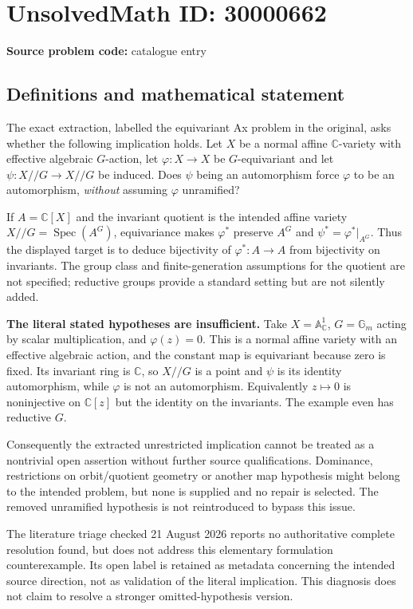 \documentclass[11pt]{article}
\newcommand{\C}{\mathbb{C}}
\begin{document}
\section*{UnsolvedMath ID: 30000662}
\textbf{Source problem code:} catalogue entry
\subsection{Definitions and mathematical statement}
The exact extraction, labelled the equivariant Ax problem in the original, asks whether the following implication holds. Let $X$ be a normal affine $\C$-variety with effective algebraic $G$-action, let $\varphi:X\to X$ be $G$-equivariant and let $\psi:X//G\to X//G$ be induced. Does $\psi$ being an automorphism force $\varphi$ to be an automorphism, \emph{without} assuming $\varphi$ unramified?

If $A=\C[X]$ and the invariant quotient is the intended affine variety $X//G=\operatorname{Spec}(A^G)$, equivariance makes $\varphi^*$ preserve $A^G$ and $\psi^*=\varphi^*|_{A^G}$. Thus the displayed target is to deduce bijectivity of $\varphi^*:A\to A$ from bijectivity on invariants. The group class and finite-generation assumptions for the quotient are not specified; reductive groups provide a standard setting but are not silently added.

\textbf{The literal stated hypotheses are insufficient.} Take $X=\mathbb A^1_\C$, $G=\mathbb G_m$ acting by scalar multiplication, and $\varphi(z)=0$. This is a normal affine variety with an effective algebraic action, and the constant map is equivariant because zero is fixed. Its invariant ring is $\C$, so $X//G$ is a point and $\psi$ is its identity automorphism, while $\varphi$ is not an automorphism. Equivalently $z\mapsto0$ is noninjective on $\C[z]$ but the identity on the invariants. The example even has reductive $G$.

Consequently the extracted unrestricted implication cannot be treated as a nontrivial open assertion without further source qualifications. Dominance, restrictions on orbit/quotient geometry or another map hypothesis might belong to the intended problem, but none is supplied and no repair is selected. The removed unramified hypothesis is not reintroduced to bypass this issue.

The literature triage checked 21 August 2026 reports no authoritative complete resolution found, but does not address this elementary formulation counterexample. Its open label is retained as metadata concerning the intended source direction, not as validation of the literal implication. This diagnosis does not claim to resolve a stronger omitted-hypothesis version.
\end{document}
